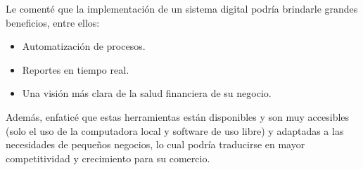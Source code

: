 Le comenté que la implementación de un sistema digital podría brindarle grandes beneficios, entre ellos: 
\begin{itemize}
    \item Automatización de procesos.
    \item Reportes en tiempo real.
    \item Una visión más clara de la salud financiera de su negocio.
\end{itemize}
 
Además, enfaticé que estas herramientas están disponibles y son muy accesibles (solo el uso de la computadora local y software de uso libre) y 
adaptadas a las necesidades de pequeños negocios, lo cual podría traducirse en mayor competitividad y crecimiento para su comercio.
